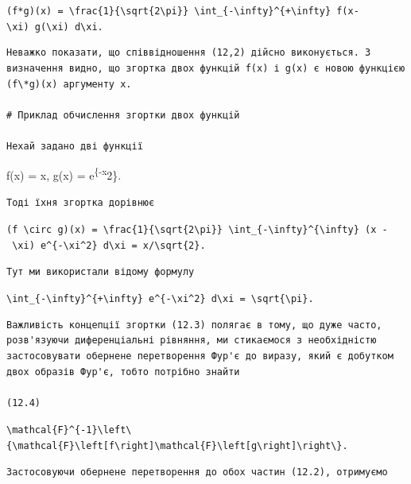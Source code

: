 \documentclass[
  ukrainian,
]{article}
\begin{document}
\texttt{(f*g)(x)\ =\ \textbackslash{}frac\{1\}\{\textbackslash{}sqrt\{2\textbackslash{}pi\}\}\ \textbackslash{}int\_\{-\textbackslash{}infty\}\^{}\{+\textbackslash{}infty\}\ f(x-\textbackslash{}xi)\ g(\textbackslash{}xi)\ d\textbackslash{}xi.}

\begin{verbatim}
Неважко показати, що співвідношення (12,2) дійсно виконується. З визначення видно, що згортка двох функцій f(x) і g(x) є новою функцією (f\*g)(x) аргументу x.

# Приклад обчислення згортки двох функцій

Нехай задано дві функції
\end{verbatim}

f(x) = x, g(x) = e\textsuperscript{\{-x}2\}.

\begin{verbatim}
Тоді їхня згортка дорівнює
\end{verbatim}

\texttt{(f\ \textbackslash{}circ\ g)(x)\ =\ \textbackslash{}frac\{1\}\{\textbackslash{}sqrt\{2\textbackslash{}pi\}\}\ \textbackslash{}int\_\{-\textbackslash{}infty\}\^{}\{\textbackslash{}infty\}\ (x\ -\ \textbackslash{}xi)\ e\^{}\{-\textbackslash{}xi\^{}2\}\ d\textbackslash{}xi\ =\ x/\textbackslash{}sqrt\{2\}.}

\begin{verbatim}
Тут ми використали відому формулу
\end{verbatim}

\texttt{\textbackslash{}int\_\{-\textbackslash{}infty\}\^{}\{+\textbackslash{}infty\}\ e\^{}\{-\textbackslash{}xi\^{}2\}\ d\textbackslash{}xi\ =\ \textbackslash{}sqrt\{\textbackslash{}pi\}.}

\begin{verbatim}
Важливість концепції згортки (12.3) полягає в тому, що дуже часто, розв'язуючи диференціальні рівняння, ми стикаємося з необхідністю застосовувати обернене перетворення Фур'є до виразу, який є добутком двох образів Фур'є, тобто потрібно знайти

(12.4)
\end{verbatim}

\texttt{\textbackslash{}mathcal\{F\}\^{}\{-1\}\textbackslash{}left\textbackslash{}\{\textbackslash{}mathcal\{F\}\textbackslash{}left{[}f\textbackslash{}right{]}\textbackslash{}mathcal\{F\}\textbackslash{}left{[}g\textbackslash{}right{]}\textbackslash{}right\textbackslash{}\}.}

\begin{verbatim}
Застосовуючи обернене перетворення до обох частин (12.2), отримуємо
\end{verbatim}
\end{document}
